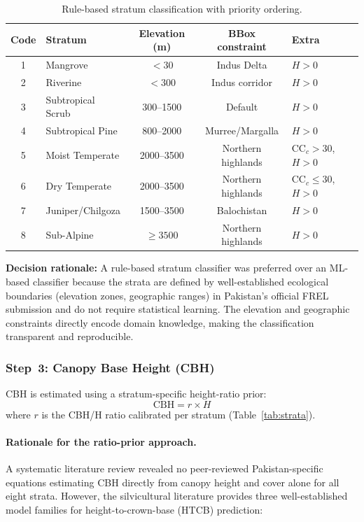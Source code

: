 \documentclass[12pt,a4paper,twoside]{article}
\newcommand{\CCc}{\text{CC}_{c}}
\newcommand{\CBH}{\text{CBH}}
\begin{document}
\begin{table}[H]
\centering
\caption{Rule-based stratum classification with priority ordering.}
\label{tab:stratum_rules}
\small
\begin{tabular}{@{}c l c c l@{}}
\toprule
\textbf{Code} & \textbf{Stratum} & \textbf{Elevation (m)} & \textbf{BBox constraint} & \textbf{Extra} \\
\midrule
1 & Mangrove          & $<30$           & Indus Delta        & $H > 0$ \\
2 & Riverine          & $<300$          & Indus corridor     & $H > 0$ \\
3 & Subtropical Scrub  & 300--1500       & Default            & $H > 0$ \\
4 & Subtropical Pine   & 800--2000       & Murree/Margalla    & $H > 0$ \\
5 & Moist Temperate    & 2000--3500      & Northern highlands & $\CCc > 30$, $H > 0$ \\
6 & Dry Temperate      & 2000--3500      & Northern highlands & $\CCc \leq 30$, $H > 0$ \\
7 & Juniper/Chilgoza   & 1500--3500      & Balochistan        & $H > 0$ \\
8 & Sub-Alpine         & $\geq 3500$     & Northern highlands & $H > 0$ \\
\bottomrule
\end{tabular}
\end{table}

\textbf{Decision rationale:} A rule-based stratum classifier was preferred over an
ML-based classifier because the strata are defined by well-established ecological
boundaries (elevation zones, geographic ranges) in Pakistan's official FREL
submission \citep{PakistanFREL2020} and do not require statistical learning.  The
elevation and geographic constraints directly encode domain knowledge, making the
classification transparent and reproducible.

\subsubsection{Step~3: Canopy Base Height (CBH)}\label{sec:cbh}

CBH is estimated using a stratum-specific height-ratio prior:
\begin{equation}
  \CBH = r \times H
  \label{eq:cbh}
\end{equation}
where $r$ is the CBH/H ratio calibrated per stratum (Table~\ref{tab:strata}).

\paragraph{Rationale for the ratio-prior approach.}\label{sec:cbh_rationale}
A systematic literature review revealed no peer-reviewed Pakistan-specific
equations estimating CBH directly from canopy height and cover alone for all
eight strata.  However, the silvicultural literature provides three well-established
model families for height-to-crown-base (HTCB) prediction:
\end{document}
